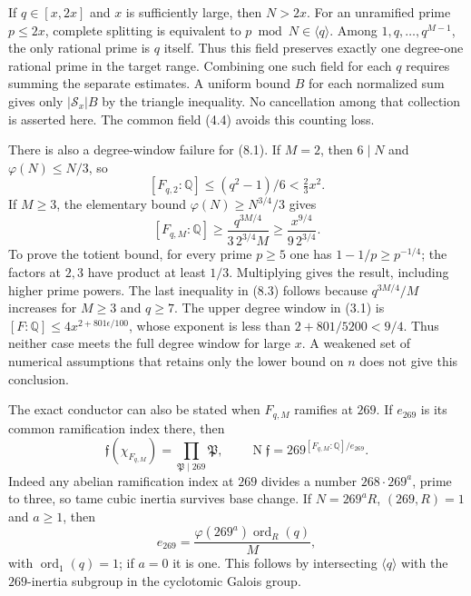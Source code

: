 \documentclass[11pt]{article}
\theoremstyle{remark}\newtheorem{remark}[theorem]{Remark}
\newcommand{\Q}{\mathbb Q}
\newcommand{\N}{\operatorname N}
\begin{document}
If $q\in[x,2x]$ and $x$ is sufficiently large, then $N>2x$.
For an unramified prime $p\le2x$, complete splitting is equivalent
to $p\bmod N\in\langle q\rangle$. Among
$1,q,\ldots,q^{M-1}$, the only rational prime is $q$ itself.
Thus this field preserves exactly one degree-one rational prime
in the target range. Combining one such field for each $q$
requires summing the separate estimates. A uniform bound $B$
for each normalized sum gives only $|\mathcal S_x|B$ by the
triangle inequality. No cancellation among that collection is
asserted here. The common field (4.4) avoids this counting loss.

There is also a degree-window failure for (8.1). If $M=2$, then
$6\mid N$ and $\varphi(N)\le N/3$, so
\[
 [F_{q,2}:\Q]\le(q^2-1)/6<\tfrac23x^2.
                                                        \tag{8.2}
\]
If $M\ge3$, the elementary bound $\varphi(N)\ge N^{3/4}/3$
gives
\[
 [F_{q,M}:\Q]\ge\frac{q^{3M/4}}{3\,2^{3/4}M}
             \ge\frac{x^{9/4}}{9\,2^{3/4}}.
                                                        \tag{8.3}
\]
To prove the totient bound, for every prime $p\ge5$ one has
$1-1/p\ge p^{-1/4}$; the factors at $2,3$ have product at least
$1/3$. Multiplying gives the result, including higher prime
powers. The last inequality in (8.3) follows because
$q^{3M/4}/M$ increases for $M\ge3$ and $q\ge7$.
The upper degree window in (3.1) is
$[F:\Q]\le4x^{2+801\epsilon/100}$, whose exponent is less
than $2+801/5200<9/4$. Thus neither case meets the full
degree window for large $x$. A weakened set of numerical assumptions that
retains only the lower bound on $n$ does not give this conclusion.

The exact conductor can also be stated when $F_{q,M}$ ramifies
at $269$. If $e_{269}$ is its common ramification index there,
then
\[
 \mathfrak f(\chi_{F_{q,M}})
       =\prod_{\mathfrak P\mid269}\mathfrak P,\qquad
 \N\mathfrak f=269^{[F_{q,M}:\Q]/e_{269}}.
                                                        \tag{8.4}
\]
Indeed any abelian ramification index at $269$ divides a number
$268\cdot269^a$, prime to three, so tame cubic inertia survives
base change. If $N=269^a R$, $(269,R)=1$ and $a\ge1$, then
\[
 e_{269}=\frac{\varphi(269^a)\operatorname{ord}_R(q)}{M},
                                                        \tag{8.5}
\]
with $\operatorname{ord}_1(q)=1$; if $a=0$ it is one.
This follows by intersecting $\langle q\rangle$ with the
$269$-inertia subgroup in the cyclotomic Galois group.


\end{document}
